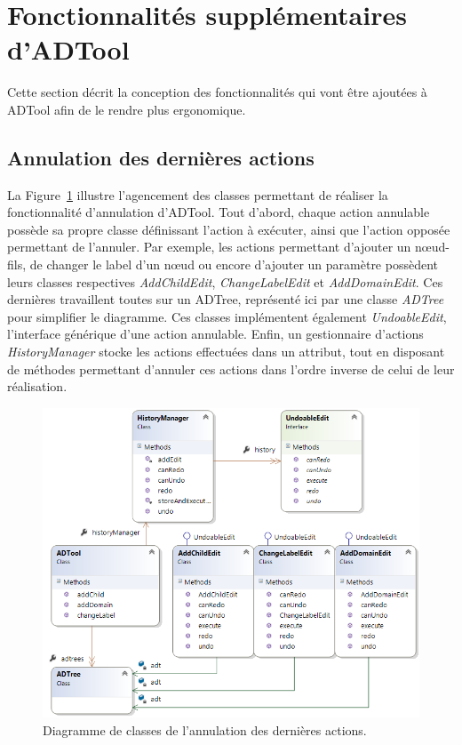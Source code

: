 \section{Fonctionnalités supplémentaires d'ADTool}
    \label{sec:ADTool}
    Cette section décrit la conception des fonctionnalités qui vont être ajoutées à ADTool afin de le rendre plus ergonomique.
    
    \subsection{Annulation des dernières actions}
    	La {\sc Figure}~{\ref{fig:ctrlz}} illustre l'agencement des classes permettant de réaliser la fonctionnalité d'annulation d'ADTool. Tout d'abord, chaque action annulable possède sa propre classe définissant l'action à exécuter, ainsi que l'action opposée permettant de l'annuler. Par exemple, les actions permettant d'ajouter un nœud-fils, de changer le label d'un nœud ou encore d'ajouter un paramètre possèdent leurs classes respectives \emph{AddChildEdit}, \emph{ChangeLabelEdit} et \emph{AddDomainEdit}. Ces dernières travaillent toutes sur un ADTree, représenté ici par une classe \emph{ADTree} pour simplifier le diagramme. Ces classes implémentent également \emph{UndoableEdit}, l'interface générique d'une action annulable. Enfin, un gestionnaire d'actions \emph{HistoryManager} stocke les actions effectuées dans un attribut, tout en disposant de méthodes permettant d'annuler ces actions dans l'ordre inverse de celui de leur réalisation.
    	
    	\begin{figure}[H]
	        \centering
	        \includegraphics[height=0.8\textwidth]{figure/ctrlz.png}
	        \caption{Diagramme de classes de l'annulation des dernières actions.}
	        \label{fig:ctrlz}
	    \end{figure}
    
